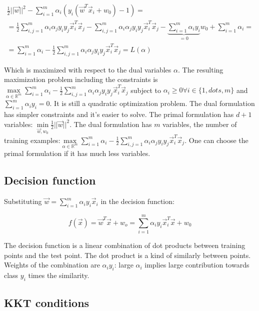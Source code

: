 		\begin{align*}
			\frac{1}{2}||\vec{w}||^2-\sum\limits_{i=1}^m\alpha_i(y_i(\vec{w}^T\vec{x}_i+w_0)-1)=\\
			=\frac{1}{2}\sum\limits_{i,j=1}^m\alpha_i\alpha_jy_iy_j\vec{x}_i^T\vec{x}_j-\sum\limits_{i,j=1}^m\alpha_i\alpha_jy_iy_j\vec{x}_i^T\vec{x}_j-\underbrace{\sum\limits_{i=1}^m\alpha_iy_i}_{=0}w_0+\sum\limits_{i=1}^m\alpha_i=\\
			=\sum\limits_{i=1}^m\alpha_i-\frac{1}{2}\sum\limits_{i,j=1}^m\alpha_i\alpha_jy_iy_j\vec{x}^T_i\vec{x}_j = L(\alpha)
		\end{align*}

		Which is maximized with respect to the dual variables $\alpha$.
		The resulting maximization problem including the constraints is $\max\limits_{\alpha\in\mathbb{R}^m}\sum\limits_{i=1}^m\alpha_i-\frac{1}{2}\sum\limits_{i,j=1}^m\alpha_i\alpha_jy_iy_j\vec{x}^T_i\vec{x}_j$ subject to $\alpha_i\ge 0\forall i\in\{1, dots, m\}$ and $\sum\limits_{i=1}^m\alpha_iy_i = 0$.
		It is still a quadratic optimization problem.
		The dual formulation has simpler constraints and it's easier to solve.
		The primal formulation has $d+1$ variables: $\min\limits_{\vec{w},w_0}\frac{1}{2}||\vec{w}||^2$.
		The dual formulation has $m$ variables, the number of training examples:$\max\limits_{\alpha\in\mathbb{R}^m}\sum\limits_{i=1}^m\alpha_i-\frac{1}{2}\sum\limits_{i,j=1}^m\alpha_i\alpha_jy_iy_j\vec{x}^T_i\vec{x}_j$.
		One can choose the primal formulation if it has much less variables.

	\subsection{Decision function}
	Substituting $\vec{w}=\sum\limits_{i=1}^m\alpha_iy_i\vec{x}_i$ in the decision function:

	$$f(\vec{x}) = \vec{w}^T\vec{x}+w_o = \sum\limits_{i=1}^m\alpha_iy_i\vec{x}^T_i\vec{x} + w_0$$

	The decision function is a linear combination of dot products between training points and the test point.
	The dot product is a kind of similarly between points.
	Weights of the combination are $\alpha_iy_i$: large $\alpha_i$ implies large contribution towards class $y_i$ times the similarity.

	\subsection{KKT conditions}

